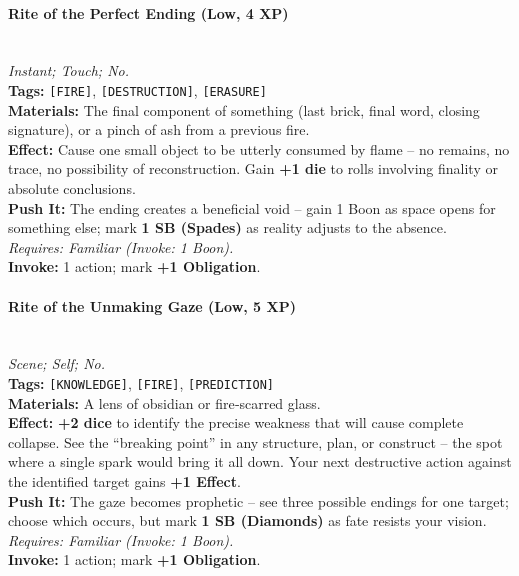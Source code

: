 \paragraph{Rite of the Perfect Ending (Low, 4 XP)} \hfill \\
\emph{Instant; Touch; No.} \\
\textbf{Tags:} \texttt{[FIRE]}, \texttt{[DESTRUCTION]}, \texttt{[ERASURE]} \\
\textbf{Materials:} The final component of something (last brick, final word, closing signature), or a pinch of ash from a previous fire. \\
\textbf{Effect:} Cause one small object to be utterly consumed by flame – no remains, no trace, no possibility of reconstruction. Gain \textbf{+1 die} to rolls involving finality or absolute conclusions. \\
\textbf{Push It:} The ending creates a beneficial void – gain 1 Boon as space opens for something else; mark \textbf{1 SB (Spades)} as reality adjusts to the absence. \\
\emph{Requires: Familiar (\textit{Invoke:} 1 Boon).} \\
\textbf{Invoke:} 1 action; mark \textbf{+1 Obligation}.

\paragraph{Rite of the Unmaking Gaze (Low, 5 XP)} \hfill \\
\emph{Scene; Self; No.} \\
\textbf{Tags:} \texttt{[KNOWLEDGE]}, \texttt{[FIRE]}, \texttt{[PREDICTION]} \\
\textbf{Materials:} A lens of obsidian or fire‑scarred glass. \\
\textbf{Effect:} \textbf{+2 dice} to identify the precise weakness that will cause complete collapse. See the “breaking point” in any structure, plan, or construct – the spot where a single spark would bring it all down. Your next destructive action against the identified target gains \textbf{+1 Effect}. \\
\textbf{Push It:} The gaze becomes prophetic – see three possible endings for one target; choose which occurs, but mark \textbf{1 SB (Diamonds)} as fate resists your vision. \\
\emph{Requires: Familiar (\textit{Invoke:} 1 Boon).} \\
\textbf{Invoke:} 1 action; mark \textbf{+1 Obligation}.

